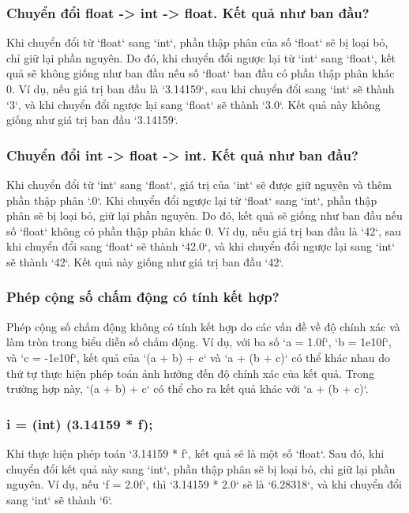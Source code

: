 \subsubsection{Chuyển đổi float -> int -> float. Kết quả như ban đầu?}

Khi chuyển đổi từ `float` sang `int`, phần thập phân của số `float` sẽ bị loại bỏ, chỉ giữ lại phần nguyên. Do đó, khi chuyển đổi ngược lại từ `int` sang `float`, kết quả sẽ không giống như ban đầu nếu số `float` ban đầu có phần thập phân khác 0. Ví dụ, nếu giá trị ban đầu là `3.14159`, sau khi chuyển đổi sang `int` sẽ thành `3`, và khi chuyển đổi ngược lại sang `float` sẽ thành `3.0`. Kết quả này không giống như giá trị ban đầu `3.14159`.

\subsubsection{Chuyển đổi int -> float -> int. Kết quả như ban đầu?}

Khi chuyển đổi từ `int` sang `float`, giá trị của `int` sẽ được giữ nguyên và thêm phần thập phân `.0`. Khi chuyển đổi ngược lại từ `float` sang `int`, phần thập phân sẽ bị loại bỏ, giữ lại phần nguyên. Do đó, kết quả sẽ giống như ban đầu nếu số `float` không có phần thập phân khác 0. Ví dụ, nếu giá trị ban đầu là `42`, sau khi chuyển đổi sang `float` sẽ thành `42.0`, và khi chuyển đổi ngược lại sang `int` sẽ thành `42`. Kết quả này giống như giá trị ban đầu `42`.

\subsubsection{Phép cộng số chấm động có tính kết hợp?}

Phép cộng số chấm động không có tính kết hợp do các vấn đề về độ chính xác và làm tròn trong biểu diễn số chấm động. Ví dụ, với ba số `a = 1.0f`, `b = 1e10f`, và `c = -1e10f`, kết quả của `(a + b) + c` và `a + (b + c)` có thể khác nhau do thứ tự thực hiện phép toán ảnh hưởng đến độ chính xác của kết quả. Trong trường hợp này, `(a + b) + c` có thể cho ra kết quả khác với `a + (b + c)`.

\subsubsection{i = (int) (3.14159 * f);}

Khi thực hiện phép toán `3.14159 * f`, kết quả sẽ là một số `float`. Sau đó, khi chuyển đổi kết quả này sang `int`, phần thập phân sẽ bị loại bỏ, chỉ giữ lại phần nguyên. Ví dụ, nếu `f = 2.0f`, thì `3.14159 * 2.0` sẽ là `6.28318`, và khi chuyển đổi sang `int` sẽ thành `6`.

